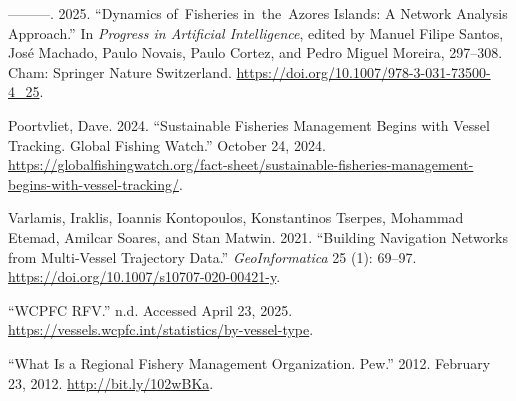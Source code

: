 \documentclass[
  letterpaper,
  DIV=11,
  numbers=noendperiod]{scrartcl}
\newlength{\cslhangindent}
\newenvironment{CSLReferences}[2] %
 {\begin{list}{}{%
  \setlength{\itemindent}{0pt}
  \setlength{\leftmargin}{0pt}
  \setlength{\parsep}{0pt}
  \ifodd #1
   \setlength{\leftmargin}{\cslhangindent}
   \setlength{\itemindent}{-1\cslhangindent}
  \fi
  \setlength{\itemsep}{#2\baselineskip}}}
 {\end{list}}
\begin{document}
\begin{CSLReferences}{1}{0}
---------. 2025. {``Dynamics of~Fisheries in~the~Azores Islands: A
Network Analysis Approach.''} In \emph{Progress in Artificial
Intelligence}, edited by Manuel Filipe Santos, José Machado, Paulo
Novais, Paulo Cortez, and Pedro Miguel Moreira, 297--308. Cham: Springer
Nature Switzerland. \url{https://doi.org/10.1007/978-3-031-73500-4_25}.

Poortvliet, Dave. 2024. {``Sustainable Fisheries Management Begins with
Vessel Tracking. Global Fishing Watch.''} October 24, 2024.
\url{https://globalfishingwatch.org/fact-sheet/sustainable-fisheries-management-begins-with-vessel-tracking/}.

Varlamis, Iraklis, Ioannis Kontopoulos, Konstantinos Tserpes, Mohammad
Etemad, Amilcar Soares, and Stan Matwin. 2021. {``Building Navigation
Networks from Multi-Vessel Trajectory Data.''} \emph{{GeoInformatica}}
25 (1): 69--97. \url{https://doi.org/10.1007/s10707-020-00421-y}.

{``WCPFC RFV.''} n.d. Accessed April 23, 2025.
\url{https://vessels.wcpfc.int/statistics/by-vessel-type}.

{``What Is a Regional Fishery Management Organization. Pew.''} 2012.
February 23, 2012. \url{http://bit.ly/102wBKa}.

\end{CSLReferences}
\end{document}
